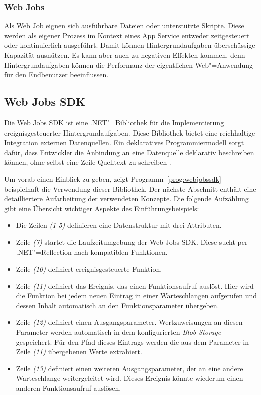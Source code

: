 \subsubsection{Web Jobs}

Als Web Job eignen sich ausführbare Dateien oder unterstützte Skripte. Diese werden als eigener Prozess im Kontext eines App Service entweder zeitgesteuert oder kontinuierlich ausgeführt. Damit können Hintergrundaufgaben überschüssige Kapazität ausnützen. Es kann aber auch zu negativen Effekten kommen, denn Hintergrundaufgaben können die Performanz der eigentlichen Web"=Anwendung für den Endbenutzer beeinflussen.

\subsection{Web Jobs SDK}
\label{subsec:webjobssdk}

Die Web Jobs SDK ist eine .NET"=Bibliothek für die Implementierung ereignisgesteuerter Hintergrundaufgaben. Diese Bibliothek bietet eine reichhaltige Integration externen Datenquellen. Ein deklaratives Programmiermodell sorgt dafür, dass Entwickler die Anbindung an eine Datenquelle deklarativ beschreiben können, ohne selbst eine Zeile Quelltext zu schreiben \cite{WebJobsSdkBindingAttributes}.

Um vorab einen Einblick zu geben, zeigt Programm~\ref{prog:webjobssdk} beispielhaft die Verwendung dieser Bibliothek. Der nächste Abschnitt enthält eine detailliertere Aufarbeitung der verwendeten Konzepte. Die folgende Aufzählung gibt eine Übersicht wichtiger Aspekte des Einführungsbeispiels:

\begin{itemize}
	\item Die Zeilen \textit{(1-5)} definieren eine Datenstruktur mit drei Attributen.
	\item Zeile \textit{(7)} startet die Laufzeitumgebung der Web Jobs SDK. Diese sucht per .NET"=Reflection nach kompatiblen Funktionen.
	\item Zeile \textit{(10)} definiert ereignisgesteuerte Funktion.
	\item Zeile \textit{(11)} definiert das Ereignis, das einen Funktionsaufruf auslöst. Hier wird die Funktion bei jedem neuen Eintrag in einer Warteschlangen aufgerufen und dessen Inhalt automatisch an den Funktionsparameter übergeben.
	\item Zeile \textit{(12)} definiert einen Ausgangsparameter. Wertzuweisungen an diesen Parameter werden automatisch in dem konfigurierten \textit{Blob Storage} gespeichert. Für den Pfad dieses Eintrags werden die aus dem Parameter in Zeile \textit{(11)} übergebenen Werte extrahiert.
	\item Zeile \textit{(13)} definiert einen weiteren Ausgangsparameter, der an eine andere Warteschlange weitergeleitet wird. Dieses Ereignis könnte wiederum einen anderen Funktionsaufruf auslösen. 
\end{itemize}

